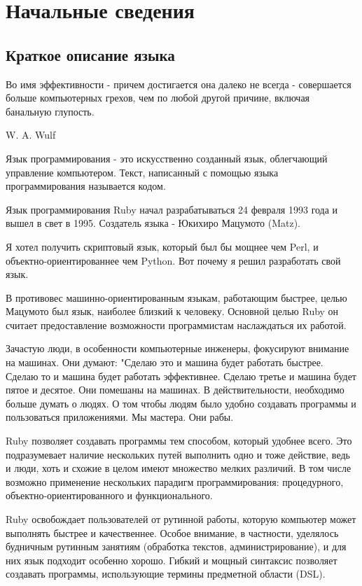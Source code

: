\chapter{Начальные сведения}

\section{Краткое описание языка}

\epigraph
{Во имя эффективности - причем достигается она далеко не всегда - совершается больше компьютерных грехов, чем по любой другой причине, включая банальную глупость.}
{W. A. Wulf}

Язык программирования - это искусственно созданный язык, облегчающий управление компьютером. Текст, написанный с помощью языка программирования называется кодом.

Язык программирования Ruby начал разрабатываться 24 февраля 1993 года и вышел в свет в 1995. Создатель языка - Юкихиро Мацумото (Matz).
\begin{note}
  Я хотел получить скриптовый язык, который был бы мощнее чем Perl, и объектно-ориентированнее чем Python. Вот почему я решил разработать свой язык.
\end{note}

В противовес машинно-ориентированным языкам, работающим быстрее, целью Мацумото был язык, наиболее близкий к человеку. Основной целью Ruby он считает предоставление возможности программистам наслаждаться их работой.
\begin{note}
  Зачастую люди, в особенности компьютерные инженеры, фокусируют внимание на машинах. Они думают: "Сделаю это и машина будет работать быстрее. Сделаю то и машина будет работать эффективнее. Сделаю третье и машина будет пятое и десятое. Они помешаны на машинах. В действительности, необходимо больше думать о людях. О том чтобы людям было удобно создавать программы и пользоваться приложениями. Мы мастера. Они рабы.
\end{note}

Ruby позволяет создавать программы тем способом, который удобнее всего. Это подразумевает наличие нескольких путей выполнить одно и тоже действие, ведь и люди, хоть и схожие в целом имеют множество мелких различий. В том числе возможно применение нескольких парадигм программирования: процедурного, объектно-ориентированного и функционального.

Ruby освобождает пользователей от рутинной работы, которую компьютер может выполнять быстрее и качественнее. Особое внимание, в частности, уделялось будничным рутинным занятиям  (обработка текстов, администрирование), и для них язык подходит особенно хорошо. Гибкий и мощный синтаксис позволяет создавать программы, использующие термины предметной области (DSL).

